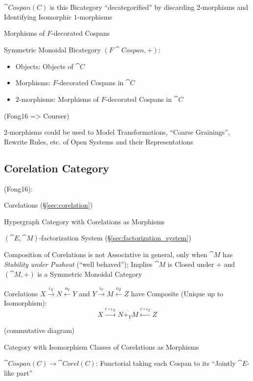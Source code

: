 $\cat{Cospan(C)}$ is this Bicategory ``decategorified'' by discarding
$2$-morphisms and Identifying Isomorphic $1$-morphisms

Morphisms of $F$-decorated Cospans

Symmetric Monoidal Bicategory $(F\cat{Cospan}, +)$:
\begin{itemize}
  \item Objects: Objects of $\cat{C}$
  \item Morphisms: $F$-decorated Cospans in $\cat{C}$
  \item $2$-morphisms: Morphisms of $F$-decorated Cospans in $\cat{C}$
\end{itemize}

(Fong16 => Courser)

$2$-morphisms could be used to Model Transformations, ``Coarse
Grainings'', Rewrite Rules, etc. of Open Systems and their
Representations



\subsection{Corelation Category}\label{sec:corelation_category}

(Fong16):

Corelations (\S\ref{sec:corelation})

Hypergraph Category with Corelations as Morphisms

$(\cat{E},\cat{M})$-factorization System
(\S\ref{sec:factorization_system})

Composition of Corelations is not Associative in general, only when
$\cat{M}$ has \emph{Stability under Pushout} (``well behaved'');
Implies $\cat{M}$ is Closed under $+$ and $(\cat{M},+)$ is a Symmetric
Monoidal Category

Corelations $X \xrightarrow{i_X} N \xleftarrow{o_Y} Y$ and $Y
\xrightarrow{i_Y} M \xleftarrow{o_Z} Z$ have Composite (Unique up to
Isomorphism):
\[
  X \xrightarrow{e\circ\iota_X} \overline{N +_Y M}
    \xleftarrow{e\circ\iota_Z} Z
\]

(commutative diagram) %

Category with Isomorphism Classes of Corelations as Morphisms

$\cat{Cospan(C)} \rightarrow \cat{Corel(C)}$: Functorial taking each
Cospan to its ``Jointly $\cat{E}$-like part''

